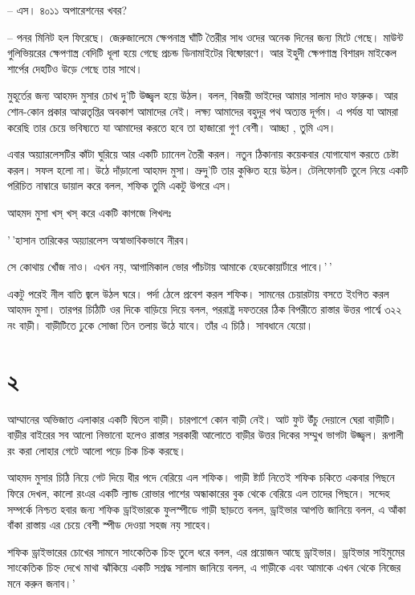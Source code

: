 \documentclass[
]{book}
\begin{document}
-- এস। ৪০১১ অপারেশনের খবর?

-- পনর মিনিট হল ফিরেছে। জেরুজালেমে ক্ষেপনাস্ত্র ঘাঁটি তৈরীর সাধ ওদের অনেক দিনের জন্য মিটে গেছে। মাউন্ট গুলিভিয়রের ক্ষেপণাস্ত্র বেদিটি ধূলা হয়ে গেছে প্রচন্ড ডিনামাইটের বিষ্ফোরণে। আর ইহুদী ক্ষেপণাস্ত্র বিশারদ মাইকেল শার্পের দেহটিও উড়ে গেছে তার সাথে।

মুহূর্তের জন্য আহমদ মুসার চোখ দু'টি উজ্জ্বল হয়ে উঠল। বলল, বিজয়ী ভাইদের আমার সালাম দাও ফারুক। আর শোন-কোন প্রকার আত্মতৃপ্তির অবকাশ আমাদের নেই। লক্ষ্য আমাদের বহুদূর পথ অত্যন্ত দূর্গম। এ পর্যন্ত যা আমরা করেছি তার চেয়ে ভবিষ্যতে যা আমাদের করতে হবে তা হাজারো গুণ বেশী। আচ্ছা , তুমি এস।

এবার অয়্যারলেসটির কাঁটা ঘুরিয়ে আর একটি চ্যানেল তৈরী করল। নতুন ঠিকানায় কয়েকবার যোগাযোগ করতে চেষ্টা করল। সফল হলো না। উঠে দাঁড়ালো আহমদ মুসা। ভ্রুদু'টি তার কুঞ্চিত হয়ে উঠল। টেলিফোনটি তুলে নিয়ে একটি পরিচিত নাম্বারে ডায়াল করে বলল, শফিক তুমি একটু উপরে এস।

আহমদ মুসা খস্ খস্ করে একটি কাগজে লিখলঃ

'\,'হাসান তারিকের অয়্যারলেস অস্বাভাবিকভাবে নীরব।

সে কোথায় খোঁজ নাও। এখন নয়, আগামিকাল ভোর পাঁচটায় আমাকে হেডকোয়ার্টারে পাবে।'\,'

একটু পরেই নীল বাতি জ্বলে উঠল ঘরে। পর্দা ঠেলে প্রবেশ করল শফিক। সামনের চেয়ারটায় বসতে ইংগিত করল আহমদ মুসা। তারপর চিঠিটি ওর দিকে বাড়িয়ে দিয়ে বলল, পররাষ্ট্র দফতরের ঠিক বিপরীতে রাস্তার উত্তর পার্শ্বে ৩২২ নং বাড়ী। বাড়ীটিতে ঢুকে সোজা তিন তলায় উঠে যাবে। তাঁর এ চিঠি। সাবধানে যেয়ো।

\section*{২}\label{ota-1-2}

আম্মানের অভিজাত এলাকার একটি দ্বিতল বাড়ী। চারপাশে কোন বাড়ী নেই। আট ফুট উঁচু দেয়ালে ঘেরা বাড়ীটি। বাড়ীর বাইরের সব আলো নিভানো হলেও রাস্তার সরকারী আলোতে বাড়ীর উত্তর দিকের সম্মুখ ভাগটা উজ্জ্বল। রূপালী রং করা লোহার গেটে আলো পড়ে চিক চিক করছে।

আহমদ মুসার চিঠি নিয়ে গেট দিয়ে ধীর পদে বেরিয়ে এল শফিক। গাড়ী ষ্টার্ট নিতেই শফিক চকিতে একবার পিছনে ফিরে দেখল, কালো রংএর একটি ল্যান্ড রোভার পাশের অন্ধাকারের বুক থেকে বেরিয়ে এল তাদের পিছনে। সন্দেহ সম্পর্কে নিশ্চত হবার জন্য শফিক ড্রাইভারকে ফুলস্পীডে গাড়ী ছাড়তে বলল, ড্রাইভার আপত্তি জানিয়ে বলল, এ আঁকা বাঁকা রাস্তায় এর চেয়ে বেশী স্পীড দেওয়া সহজ নয় সাহেব।

শফিক ড্রাইভারের চোখের সামনে সাংকেতিক চিহ্ন তুলে ধরে বলল, এর প্রয়োজন আছে ড্রাইভার। ড্রাইভার সাইমুমের সাংকেতিক চিহ্ন দেখে মাথা ঝাঁকিয়ে একটি সশ্রদ্ধ সালাম জানিয়ে বলল, এ গাড়ীকে এবং আমাকে এখন থেকে নিজের মনে করুন জনাব।'
\end{document}
